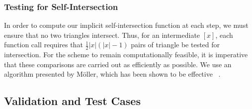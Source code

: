 \subsubsection{Testing for Self-Intersection}

In order to compute our implicit self-intersection function at each step, we must ensure that no two triangles intersect. Thus, for an intermediate $[x]$, each function call requires that $\frac{1}{2}|x|(|x| - 1)$ pairs of triangle be tested for intersection. For the scheme to remain computationally feasible, it is imperative that these comparisons are carried out as efficiently as possible. We use an algorithm presented by M\"oller, which has been shown to be effective ~\cite{Möller97afast}.


\subsection{Validation and Test Cases}

